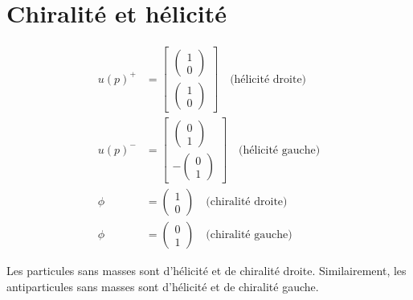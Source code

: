 \documentclass[12pt]{article}
\begin{document}
\section{Chiralité et hélicité}
\begin{align}
    u(p)^+ &= \begin{bmatrix}
      \begin{pmatrix}
          1\\ 0
      \end{pmatrix}\\
      \begin{pmatrix}
          1\\ 0
      \end{pmatrix}
    \end{bmatrix}
    \quad \text{(hélicité droite)}\\
    u(p)^- &= \begin{bmatrix}
      \begin{pmatrix}
          0\\1
      \end{pmatrix}\\
      -\begin{pmatrix}
          0\\1
      \end{pmatrix}
    \end{bmatrix}
    \quad \text{(hélicité gauche)}\\
    \phi &=
    \begin{pmatrix}
          1\\ 0
     \end{pmatrix}
     \quad \text{(chiralité droite)}\\
     \phi &=
    \begin{pmatrix}
          0\\1
      \end{pmatrix}
      \quad \text{(chiralité gauche)}
\end{align}

Les particules sans masses sont d'hélicité et de chiralité droite. Similairement, les antiparticules sans masses sont d'hélicité et de chiralité gauche.
\end{document}
